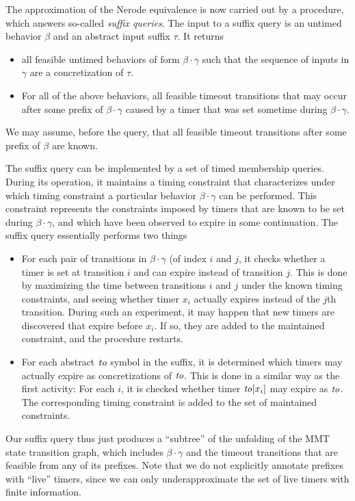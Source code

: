 The approximation of the Nerode equivalence is now carried out by a procedure,
which answers so-called {\em suffix queries}.
The input to a suffix query is
an untimed behavior $\beta$ and an abstract input suffix $\tau$. It returns
\begin{itemize}
\item
  all feasible untimed behaviors of form $\beta \cdot \gamma$ such that the
  sequence of inputs in $\gamma$ are a concretization of $\tau$.
\item
  For all of the above behaviors, all feasible timeout transitions that may
  occur after some prefix of $\beta \cdot \gamma$ caused by
  a timer that was set sometime during $\beta \cdot \gamma$.
\end{itemize}
We may assume, before the query, that all feasible timeout transitions
after some prefix of $\beta$ are known.

The suffix query can be implemented by a set of timed membership queries.
During its operation, it maintains a timing constraint that characterizes
under which timing constraint a particular behavior $\beta \cdot \gamma$
can be performed. This constraint represents the constraints imposed
by timers that are known to be set during $\beta \cdot \gamma$, and
which have been observed to expire in some continuation.
The suffix query essentially performs two things
\begin{itemize}
\item For each pair of transitions in $\beta \cdot \gamma$ (of index $i$ and $j$,
  it checks whether a timer is set at transition $i$ and can expire instead of
  transition $j$. This is done by maximizing the time between transitions $i$ and
  $j$ under the known timing constraints, and seeing whether timer $x_i$
  actually expires instead of the $j$th transition. During such an experiment,
  it may happen that new timers are discovered that expire before $x_i$. If so,
  they are added to the maintained constraint, and the procedure restarts.
\item For each abstract $\mathit{to}$ symbol in the suffix, it is determined
  which timers may actually expire as concretizations of $\mathit{to}$. This is
  done in a similar way as the first activity: For each $i$, it is checked
  whether timer $\mathit{to}[x_i]$ may expire as $\mathit{to}$. The corresponding
  timing constraint is added to the set of maintained constraints.
\end{itemize}
    Our suffix query thus just produces a ``subtree'' of the
    unfolding of the MMT state transition graph, which includes
    $\beta\cdot\gamma$ and the timeout transitions that are feasible from
    any of its prefixes. Note that we do not explicitly annotate prefixes with
    ``live'' timers, since we can only underapproximate the set of live
    timers with finite information.

